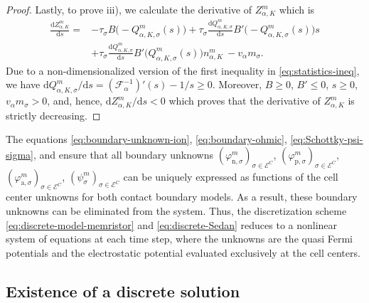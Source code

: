 \documentclass[10pt,a4paper, final]{article}
\def\electrons{\text{n}}
\def\holes{\text{p}}
\def\ions{\text{a}}
\theoremstyle{definition}								%
\numberwithin{equation}{section}
\numberwithin{figure}{section}
\numberwithin{theorem}{section}
\begin{document}
\begin{proof}
    Lastly, to prove iii), we calculate the derivative of $Z_{\alpha, K}^m$ which is
    \begin{align*}
        \frac{\text{d} Z_{\alpha, K}^m}{ \text{d} s}
        = &- \tau_\sigma B \bigl(-Q_{\alpha, K, \sigma}^m(s)\bigr)
        + \tau_\sigma \frac{\text{d} Q_{\alpha, K, \sigma}^m}{\text{d} s} B' \bigl(-Q_{\alpha, K, \sigma}^m(s)\bigr) s\\
        ~
        &+ \tau_\sigma \frac{\text{d} Q_{\alpha, K, \sigma}^m}{\text{d} s} B'\bigl(Q_{\alpha, K, \sigma}^m (s) \bigr) n_{\alpha, K}^m
        ~
        - v_\alpha m_\sigma.
    \end{align*}
    Due to a non-dimensionalized version of the first inequality in \eqref{eq:statistics-ineq}, we have
    $
    \text{d} Q_{\alpha, K, \sigma}^m/ \text{d} s = ( \mathcal{F}_\alpha^{-1} )' (s) - 1/s \geq 0
    $.
    Moreover, $B \geq 0$, $ B' \leq 0$, $s \geq 0$, $v_\alpha m_\sigma >0$, and, hence, $\text{d} Z_{\alpha, K}^m/ \text{d} s < 0$ which proves that the derivative of $Z_{\alpha, K}^m$ is strictly decreasing.
\end{proof}
The equations \eqref{eq:boundary-unknown-ion}, \eqref{eq:boundary-ohmic}, \eqref{eq:Schottky-psi-sigma},  and  ensure that all boundary unknowns $ (\varphi_{\electrons, \sigma}^{m})_{\sigma\in{\mathcal E}^C}$, $(\varphi_{\holes, \sigma}^{m})_{\sigma\in{\mathcal E}^C}$, $(\varphi_{\ions, \sigma}^{m})_{\sigma\in{\mathcal E}^C}$, $(\psi_{\sigma}^{m})_{\sigma\in{\mathcal E}^C}$ can be uniquely expressed as functions of the cell center unknowns for both contact boundary models.
As a result, these boundary unknowns can be eliminated from the system.
Thus, the discretization scheme \eqref{eq:discrete-model-memristor} and \eqref{eq:discrete-Sedan} reduces to a nonlinear system of equations at each time step, where the unknowns are the quasi Fermi potentials and the electrostatic potential evaluated exclusively at the cell centers.


\subsection{Existence of a discrete solution} \label{sec:existence}
\end{document}
